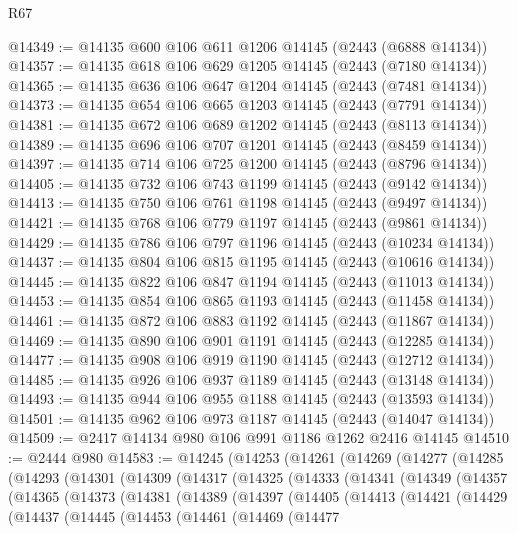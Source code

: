 \begin{lexlean}{R67}
\begin{coremodule}
@14349 := @14135 @600 @106 @611 @1206 @14145 (@2443 (@6888 @14134))
@14357 := @14135 @618 @106 @629 @1205 @14145 (@2443 (@7180 @14134))
@14365 := @14135 @636 @106 @647 @1204 @14145 (@2443 (@7481 @14134))
@14373 := @14135 @654 @106 @665 @1203 @14145 (@2443 (@7791 @14134))
@14381 := @14135 @672 @106 @689 @1202 @14145 (@2443 (@8113 @14134))
@14389 := @14135 @696 @106 @707 @1201 @14145 (@2443 (@8459 @14134))
@14397 := @14135 @714 @106 @725 @1200 @14145 (@2443 (@8796 @14134))
@14405 := @14135 @732 @106 @743 @1199 @14145 (@2443 (@9142 @14134))
@14413 := @14135 @750 @106 @761 @1198 @14145 (@2443 (@9497 @14134))
@14421 := @14135 @768 @106 @779 @1197 @14145 (@2443 (@9861 @14134))
@14429 := @14135 @786 @106 @797 @1196 @14145 (@2443 (@10234 @14134))
@14437 := @14135 @804 @106 @815 @1195 @14145 (@2443 (@10616 @14134))
@14445 := @14135 @822 @106 @847 @1194 @14145 (@2443 (@11013 @14134))
@14453 := @14135 @854 @106 @865 @1193 @14145 (@2443 (@11458 @14134))
@14461 := @14135 @872 @106 @883 @1192 @14145 (@2443 (@11867 @14134))
@14469 := @14135 @890 @106 @901 @1191 @14145 (@2443 (@12285 @14134))
@14477 := @14135 @908 @106 @919 @1190 @14145 (@2443 (@12712 @14134))
@14485 := @14135 @926 @106 @937 @1189 @14145 (@2443 (@13148 @14134))
@14493 := @14135 @944 @106 @955 @1188 @14145 (@2443 (@13593 @14134))
@14501 := @14135 @962 @106 @973 @1187 @14145 (@2443 (@14047 @14134))
@14509 := @2417 @14134 @980 @106 @991 @1186 @1262 @2416 @14145
@14510 := @2444 @980
@14583 := @14245
    (@14253
      (@14261
        (@14269
          (@14277
            (@14285
              (@14293
                (@14301
                  (@14309
                    (@14317
                      (@14325
                        (@14333
                          (@14341
                            (@14349
                              (@14357
                                (@14365
                                  (@14373
                                    (@14381
                                      (@14389
                                        (@14397
                                          (@14405
                                            (@14413
                                              (@14421
                                                (@14429
                                                  (@14437
                                                    (@14445
                                                      (@14453
                                                        (@14461
                                                          (@14469
                                                            (@14477

\end{coremodule}
\end{lexlean}
